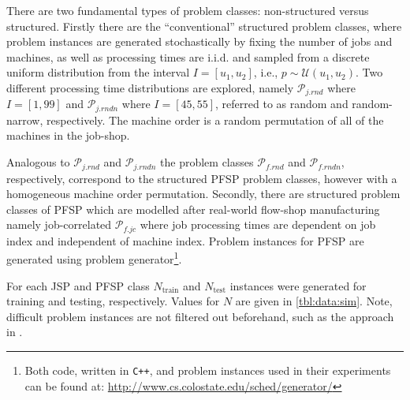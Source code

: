 \documentclass[graybox]{svmult}
\begin{document}
There are two fundamental types of problem classes: non-structured versus 
structured. 
Firstly there are the ``conventional'' structured problem classes, where 
problem instances are generated stochastically by fixing the number of jobs and 
machines, as well as processing times are i.i.d. and sampled from a discrete 
uniform distribution from the interval $I=[u_1,u_2]$, i.e., $p\sim 
\mathcal{U}(u_1,u_2)$.
Two different processing time distributions are explored, namely 
$\mathcal{P}_{j.rnd}$ where $I=[1,99]$ and $\mathcal{P}_{j.rndn}$ where 
$I=[45,55]$, referred to as random and random-narrow, respectively.
The machine order is a random permutation of all of the machines in the 
job-shop. 

Analogous to $\mathcal{P}_{j.rnd}$ and $\mathcal{P}_{j.rndn}$ the problem 
classes $\mathcal{P}_{f.rnd}$ and $\mathcal{P}_{f.rndn}$, respectively, 
correspond to the structured PFSP problem classes, however with a homogeneous 
machine order permutation.  
Secondly, there are structured problem classes of PFSP which are modelled after 
real-world flow-shop manufacturing namely job-correlated $\mathcal{P}_{f.jc}$ 
where job processing times are dependent on job index and independent of 
machine index.
Problem instances for PFSP are generated using \cite{Whitley} problem 
generator\footnote{Both code, written in \texttt{C++}, and problem instances 
	used in their experiments can be found at: 
	\url{http://www.cs.colostate.edu/sched/generator/}}. 

For each JSP and PFSP class $N_{\text{train}}$  and $N_{\text{test}}$ instances 
were generated for training and testing, respectively. Values for $N$ are given 
in \cref{tbl:data:sim}. Note, difficult problem instances are not filtered out 
beforehand, such as the approach in \cite{Whitley}. 
\end{document}
